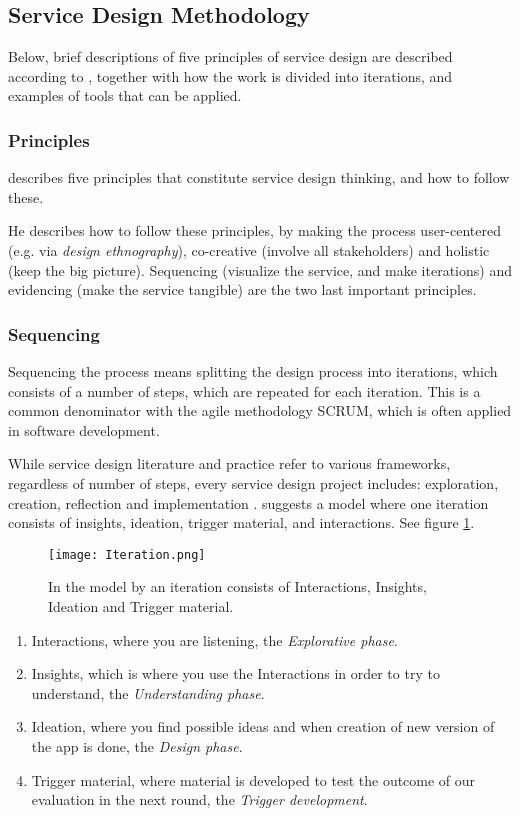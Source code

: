\subsection{Service Design Methodology}

Below, brief descriptions of five principles of service design are described according to \cite{stickdorn}, together with how the work is divided into iterations, and examples of tools that can be applied.

\subsubsection{Principles}
\cite{stickdorn} describes five principles that constitute service design thinking, and how to follow these.

He describes how to follow these principles, by making the process user-centered (e.g. via \textit{design ethnography}), co-creative (involve all stakeholders) and holistic (keep the big picture). Sequencing (visualize the service, and make iterations) and evidencing (make the service tangible) are the two last important principles.

\subsubsection{Sequencing}
Sequencing the process means splitting the design process into iterations, which consists of a number of steps, which are repeated for each iteration. This is a common denominator with the agile methodology SCRUM, which is often applied in software development.

While service design literature and practice refer to various frameworks, regardless of number of steps, every service design project includes: exploration, creation, reflection and implementation \citep{stickdorn}. \cite{expedition-mondial} suggests a model where one iteration consists of insights, ideation, trigger material, and interactions. See figure \ref{fig:iteration}.

\begin{figure}[h]
    \centering
    \texttt{[image: Iteration.png]}
    \caption{In the model by \cite{nissar} an iteration consists of Interactions, Insights, Ideation and Trigger material.}
    \label{fig:iteration}
\end{figure}

\begin{enumerate}
\item Interactions, where you are listening, the \textit{Explorative phase}.
\item Insights, which is where you use the Interactions in order to try to understand, the \textit{Understanding phase}. %
\item Ideation, where you find possible ideas and when creation of new version of the app is done, the \textit{Design phase}.
\item Trigger material, where material is developed to test the outcome of our evaluation in the next round, the \textit{Trigger development}.
\end{enumerate}


